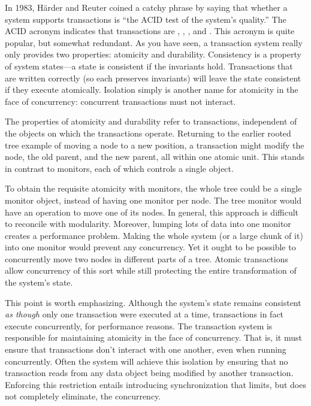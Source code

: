 In 1983, H{\"a}rder and
Reuter coined a catchy phrase by saying that
whether a system supports transactions is ``the ACID test of the
system's quality.''  The ACID acronym indicates that transactions are
, , , and
.  This acronym is quite popular, but somewhat
redundant.  As you have seen, a transaction system really only provides
two properties: atomicity and durability.  Consistency is a property
of system states---a state is consistent if the invariants hold.
Transactions that are written correctly (so each preserves invariants)
will leave the state consistent if they execute atomically.  Isolation
simply is another name for atomicity in the face of concurrency:
concurrent transactions must not interact.

The properties of atomicity and durability refer to transactions,
independent of the objects on which the transactions operate.
Returning to the earlier rooted tree example of moving a node to a new
position, a transaction might modify the node, the old parent, and the
new parent, all within one atomic unit.  This stands in contrast
to monitors, each of which controls a single
object.

To obtain the requisite atomicity with monitors, the whole tree could
be a single monitor object, instead of having one monitor per node.  The tree
monitor would
have an operation to move one of its nodes.  In general, this approach
is difficult to reconcile with modularity. Moreover, lumping lots of
data into one monitor creates a performance problem.  Making the
whole system (or a large chunk of it) into one monitor would prevent
any concurrency.  Yet it ought to be possible to concurrently move two
nodes in different parts of a tree.  Atomic transactions allow
concurrency of this sort while still protecting the entire
transformation of the system's state.

This point is worth emphasizing.  Although the system's state remains
consistent \emph{as though} only one transaction were executed at a
time, transactions in fact execute concurrently, for performance
reasons.  The transaction system is responsible for maintaining
atomicity in the face of concurrency.  That is, it must ensure that
transactions don't interact with one another, even when running
concurrently.  Often the system will achieve this isolation by
ensuring that no transaction reads from any data object being
modified by another transaction.  Enforcing this restriction entails introducing
synchronization that limits, but does not completely eliminate, the
concurrency.

